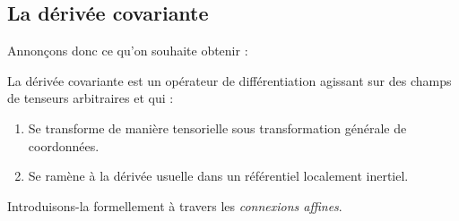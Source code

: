 
\subsection{La dérivée covariante}
Annonçons donc ce qu'on souhaite obtenir :
\begin{theoremframe}
    \begin{defi}
    \label{def:covariant der}
        La dérivée covariante est un opérateur de différentiation agissant sur des champs de tenseurs arbitraires et qui : 
        \begin{enumerate}[label=\roman*.]
            \item Se transforme de manière tensorielle sous transformation générale de coordonnées.
            \item Se ramène à la dérivée usuelle dans un référentiel localement inertiel. 
        \end{enumerate}
    \end{defi}
\end{theoremframe}
Introduisons-la formellement à travers les \emph{connexions affines}.

